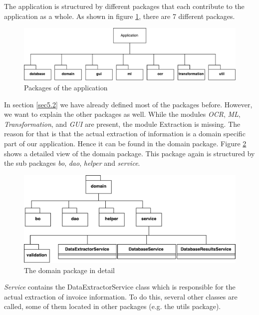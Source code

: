 The application is structured by different packages that each contribute to the application as a whole.
As shown in figure \ref{applicationUML}, there are 7 different packages. 

\begin{figure}[ht!]
\centering
\includegraphics[width=\textwidth,natwidth=251,natheight=62]{Images/UML/ApplicationUML.pdf}
\caption{Packages of the application \label{applicationUML}}
\end{figure}

In section \ref{sec5.2} we have already defined most of the packages before. However, we want to explain the other packages as well. While the modules \emph{OCR}, \emph{ML}, \emph{Transformation}, and \emph{GUI} are present, the module Extraction is missing. The reason for that is that the actual extraction of information is a domain specific part of our application. Hence it can be found in the domain package. Figure \ref{domainUML} shows a detailed view of the domain package. This package again is structured by the sub packages \emph{bo}, \emph{dao}, \emph{helper} and \emph{service}.

\begin{figure}[ht!]
\centering
%
\includegraphics[width=\textwidth,natwidth=205,natheight=85]{Images/UML/DomainML.pdf}
\caption{The domain package in detail \label{domainUML}}
\end{figure}

\emph{Service} contains the DataExtractorService class which is responsible for the actual extraction of invoice information. To do this, several other classes are called, some of them located in other packages (e.g. the utils package).

